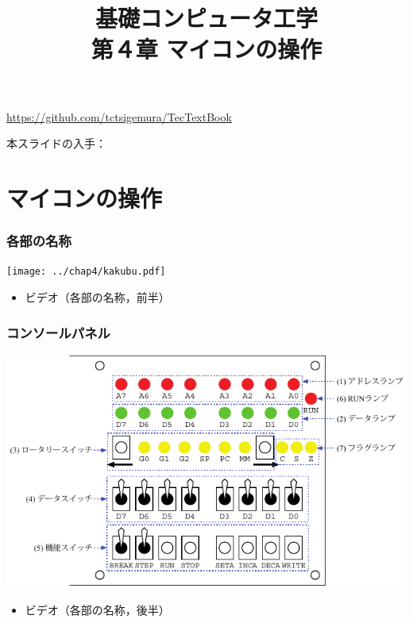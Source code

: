 \documentclass{beamer}                 %
\begin{document}
\title{基礎コンピュータ工学\\第４章 マイコンの操作}
\date{}

\begin{frame}
  \titlepage
  \centerline{\url{https://github.com/tctsigemura/TecTextBook}}
  \vfill
  \centerline{本スライドの入手：
    }
\end{frame}


\section{マイコンの操作}
\begin{frame}
  \frametitle{各部の名称}
  \vfill
  \centerline{\texttt{[image: ../chap4/kakubu.pdf]}}
  \vfill
  \begin{itemize}
    \item ビデオ（各部の名称，前半）
  \end{itemize}
  \vfill
\end{frame}

\begin{frame}
  \frametitle{コンソールパネル}
  \vfill
  \centerline{\includegraphics[scale=1.0]{../chap4/console.pdf}}
  \vfill
  \begin{itemize}
    \item ビデオ（各部の名称，後半）
  \end{itemize}
  \vfill
\end{frame}
\end{document}
